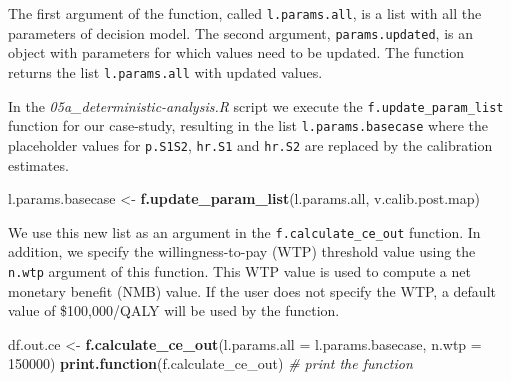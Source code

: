 \documentclass[]{article}
\newenvironment{Shaded}{\begin{snugshade}}{\end{snugshade}}
\newcommand{\KeywordTok}[1]{\textcolor[rgb]{0.13,0.29,0.53}{\textbf{#1}}}
\newcommand{\DataTypeTok}[1]{\textcolor[rgb]{0.13,0.29,0.53}{#1}}
\newcommand{\DecValTok}[1]{\textcolor[rgb]{0.00,0.00,0.81}{#1}}
\newcommand{\StringTok}[1]{\textcolor[rgb]{0.31,0.60,0.02}{#1}}
\newcommand{\CommentTok}[1]{\textcolor[rgb]{0.56,0.35,0.01}{\textit{#1}}}
\newcommand{\NormalTok}[1]{#1}
\begin{document}
The first argument of the function, called \texttt{l.params.all}, is a
list with all the parameters of decision model. The second argument,
\texttt{params.updated}, is an object with parameters for which values
need to be updated. The function returns the list \texttt{l.params.all}
with updated values.

In the \emph{05a\_deterministic-analysis.R} script we execute the
\texttt{f.update\_param\_list} function for our case-study, resulting in
the list \texttt{l.params.basecase} where the placeholder values for
\texttt{p.S1S2}, \texttt{hr.S1} and \texttt{hr.S2} are replaced by the
calibration estimates.

\begin{Shaded}
\begin{Highlighting}[]
\NormalTok{l.params.basecase <-}\StringTok{ }\KeywordTok{f.update_param_list}\NormalTok{(l.params.all, v.calib.post.map) }
\end{Highlighting}
\end{Shaded}

We use this new list as an argument in the \texttt{f.calculate\_ce\_out}
function. In addition, we specify the willingness-to-pay (WTP) threshold
value using the \texttt{n.wtp} argument of this function. This WTP value
is used to compute a net monetary benefit (NMB) value. If the user does
not specify the WTP, a default value of \$100,000/QALY will be used by
the function.

\begin{Shaded}
\begin{Highlighting}[]
\NormalTok{df.out.ce <-}\StringTok{ }\KeywordTok{f.calculate_ce_out}\NormalTok{(}\DataTypeTok{l.params.all =}\NormalTok{ l.params.basecase, }
                                \DataTypeTok{n.wtp =} \DecValTok{150000}\NormalTok{)}
\KeywordTok{print.function}\NormalTok{(f.calculate_ce_out) }\CommentTok{# print the function}
\end{Highlighting}
\end{Shaded}
\end{document}

